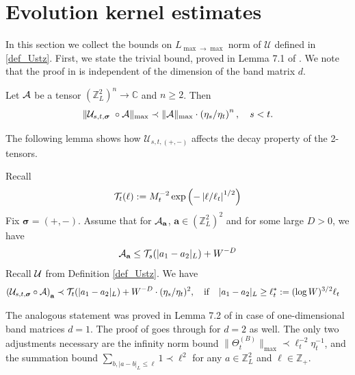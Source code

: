 \section{Evolution kernel estimates}\label{ks}

In this section we collect the bounds on $L_{\max\to \max}$ norm of $\mathcal{U}$ defined in \eqref{def_Ustz}. First, we state the trivial bound, proved in Lemma 7.1 of \cite{YY_25}. We note that the proof in \cite{YY_25} is independent of the dimension of the band matrix $d$. 

\begin{lemma}\label{lem:sum_Ndecay}
Let $\cal A$ be a tensor $\left(\mathbb{Z}_L^2\right)^n\to \mathbb C$ and $n\ge 2$.  
Then 
\begin{align}\label{sum_res_Ndecay}
   \| {\cal U}_{s,t,\boldsymbol{\sigma}}\;\circ {\cal A}\|_{\max } \prec \|{\cal A}\|_{\max}
    \cdot \left(  \eta_s/ \eta_t\right)^{n } ,\quad s<t. 
\end{align}
\end{lemma}

The following lemma shows how $\mathcal{U}_{s,t,(+,-)}$ affects the decay property of the 2-tensors.

\begin{lemma}\label{TailtoTail}
Recall  
$$
{\cal T}_{t}(\ell) := M_t^{-2}\exp \left(- \left| \ell /\ell_t\right|^{1/2} \right)
$$
Fix $\boldsymbol{\sigma}=(+,-)$. Assume that for ${\cal A}_{\textbf{a}}$, $\textbf{a}\in (\mathbb Z^2_L)^2$ and for some large $D>0$, we have 
$$
{\cal A}_{\textbf{a}}\le {\cal T}_{s }(|a_1-a_2|_L)+W^{-D}
$$
Recall $\cal U$ from Definition \ref{def_Ustz}. We have 
\begin{align}
\label{neiwuj} 
\left({\cal U}_{s,t,\boldsymbol{\sigma}} \circ 
{\cal A}\right)_{\textbf{a}} & \prec
 {\cal T}_{t}(|a_1-a_2|_L)+W^{-D} \cdot(\eta_s/\eta_t)^2, \quad {\rm if}\quad  |a_1-a_2|_{L}\ge \ell_t^* :=(\log W)^{3/2}\ell_t 
\end{align}
 \end{lemma}

The analogous statement was proved in Lemma 7.2 of \cite{YY_25} in case of one-dimensional band matrices $d=1$. The proof of \cite{YY_25} goes through for $d=2$ as well. The only two adjustments necessary are the infinity norm bound $\|\Theta^{(B)}_t\|_{\max} \prec \ell_t^{-2}\eta_t^{-1}$, and the summation bound $\sum_{b, |a-b|_{L}\le \ell} 1 \prec \ell^2$ for any $a\in\mathbb{Z}_L^2$ and $\ell\in\mathbb{Z}_+$.
 

